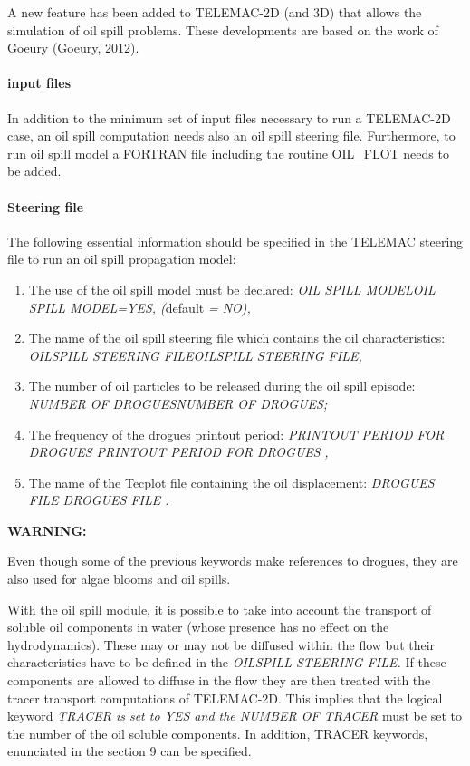 \documentclass{article} %
\begin{document}
 A new feature has been added to TELEMAC-2D (and 3D) that allows the simulation of oil spill problems. These developments are based on the work of Goeury (Goeury, 2012).


\paragraph{ input files}

 In addition to the minimum set of input files necessary to run a TELEMAC-2D case, an oil spill computation needs also an oil spill steering file. Furthermore, to run oil spill model a FORTRAN file including the routine OIL\_FLOT needs to be added.


\paragraph{ Steering file}

 The following essential information should be specified in the TELEMAC steering file to run an oil spill propagation model:

\begin{enumerate}
\item  The use of the oil spill model must be declared: \textit{OIL SPILL MODELOIL SPILL MODEL=YES, (}default\textit{ = NO),}

\item  The name of the oil spill steering file which contains the oil characteristics: \textit{OILSPILL STEERING FILEOILSPILL STEERING FILE,}

\item  The number of oil particles to be released during the oil spill episode: \textit{NUMBER OF DROGUESNUMBER OF DROGUES;}

\item  The frequency of the drogues printout period: \textit{PRINTOUT PERIOD FOR DROGUES PRINTOUT PERIOD FOR DROGUES} \textit{,}

\item  The name of the Tecplot file containing the oil displacement: \textit{DROGUES FILE DROGUES FILE} \textit{.}
\end{enumerate}

 \textbf{WARNING:}

 Even though some of the previous keywords make references to drogues, they are also used for algae blooms and oil spills.

 With the oil spill module, it is possible to take into account the transport of soluble oil components in water (whose presence has no effect on the hydrodynamics). These may or may not be diffused within the flow but their characteristics have to be defined in the \textit{OILSPILL STEERING FILE.} If these components are allowed to diffuse in the flow they are then treated with the tracer transport computations of TELEMAC-2D. This implies that the logical keyword \textit{TRACER is set to YES and the NUMBER OF TRACER} must be set to the number of the oil soluble components. In addition, TRACER keywords, enunciated in the section 9 can be specified.
\end{document}
